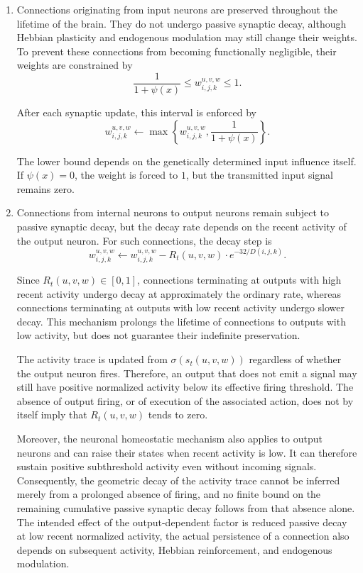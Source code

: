 \documentclass[12pt,a4paper]{article}
\begin{document}
\begin{enumerate}
    \item Connections originating from input neurons are preserved throughout the lifetime of the brain. They do not undergo passive synaptic decay, although Hebbian plasticity and endogenous modulation may still change their weights. To prevent these connections from becoming functionally negligible, their weights are constrained by
	$$\frac{1}{1+\psi(x)}\leq w_{i,j,k}^{u,v,w}\leq1.$$
	
	After each synaptic update, this interval is enforced by
	$$w_{i,j,k}^{u,v,w}\leftarrow \max \left\{ w_{i,j,k}^{u,v,w},\frac{1}{1+\psi(x)} \right\}.$$
	
	The lower bound depends on the genetically determined input influence itself. If $\psi(x)=0$, the weight is forced to $1$, but the transmitted input signal remains zero.
	
	\item Connections from internal neurons to output neurons remain subject to passive synaptic decay, but the decay rate depends on the recent activity of the output neuron. For such connections, the decay step is
	$$w_{i,j,k}^{u,v,w}\leftarrow w_{i,j,k}^{u,v,w} - R_t(u,v,w) \cdot e^{-32/D(i,j,k)}.$$

	Since $R_t(u,v,w) \in [0,1]$, connections terminating at outputs with high recent activity undergo decay at approximately the ordinary rate, whereas connections terminating at outputs with low recent activity undergo slower decay. This mechanism prolongs the lifetime of connections to outputs with low activity, but does not guarantee their indefinite preservation.

	The activity trace is updated from $\sigma(s_t(u,v,w))$ regardless of whether the output neuron fires. Therefore, an output that does not emit a signal may still have positive normalized activity below its effective firing threshold. The absence of output firing, or of execution of the associated action, does not by itself imply that $R_t(u,v,w)$ tends to zero.

	Moreover, the neuronal homeostatic mechanism also applies to output neurons and can raise their states when recent activity is low. It can therefore sustain positive subthreshold activity even without incoming signals. Consequently, the geometric decay of the activity trace cannot be inferred merely from a prolonged absence of firing, and no finite bound on the remaining cumulative passive synaptic decay follows from that absence alone. The intended effect of the output-dependent factor is reduced passive decay at low recent normalized activity, the actual persistence of a connection also depends on subsequent activity, Hebbian reinforcement, and endogenous modulation.


\end{enumerate}
\end{document}
